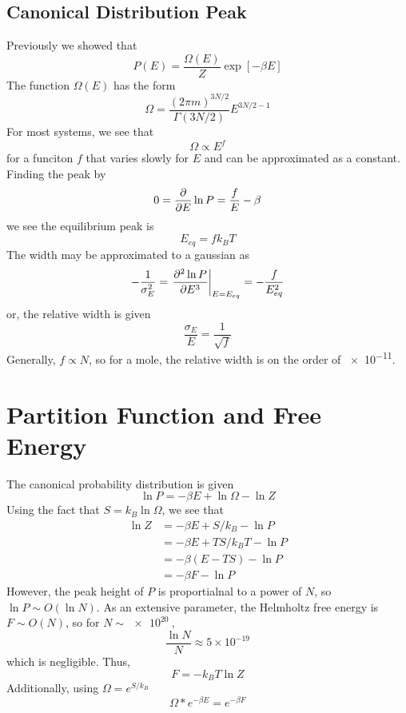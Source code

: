 \subsection{Canonical Distribution Peak}
Previously we showed that
\[P(E) = \frac{\Omega(E)}{Z}\exp[-\beta E]\]
The function \(\Omega(E)\) has the form
\[\Omega = \frac{(2\pi m)^{3N/2}}{\Gamma(3N/2)}E^{3N/2-1}\]
For most systems, we see that
\[\Omega\propto E^f\]
for a funciton \(f\) that varies slowly for \(E\) and can be approximated as a constant. Finding the peak by
\[0=\frac{\partial }{\partial E}\ln P = \frac{f}{E}-\beta\]
we see the equilibrium peak is 
\[E_{eq}=fk_BT\]
The width may be approximated to a gaussian as
\[-\frac{1}{\sigma_E^2} = \left.\frac{\partial ^2\ln P}{\partial E^3}\right|_{E=E_{eq}} = -\frac{f}{E_{eq}^2}\]
or, the relative width is given
\[\frac{\sigma_E}{E}=\frac{1}{\sqrt{f}}\]
Generally, \(f\propto N\), so for a mole, the relative width is on the order of \SI{e-11}{}.

\section{Partition Function and Free Energy}
The canonical probability distribution is given
\[\ln P = -\beta E + \ln \Omega - \ln Z\]
Using the fact that \(S=k_B\ln\Omega\), we see that
\begin{align*}
	\ln Z &= -\beta E + S/k_B - \ln P\\
	      &= -\beta E + TS/k_B T -\ln P\\
	      &= -\beta(E-TS) - \ln P\\
	      &= -\beta F -\ln P
\end{align*}
However, the peak height of \(P\) is proportialnal to a power of \(N\), so \(\ln P \sim O(\ln N)\). As an extensive parameter, the Helmholtz free energy is \(F\sim O(N)\), so for \(N\sim\SI{e20}{}\),
\[\frac{\ln N}{N}\approx 5\times 10^{-19}\]
which is negligible. Thus,
\begin{equation}
	F = -k_BT\ln Z
\end{equation}
Additionally, using \(\Omega = e^{S/k_B}\)
\begin{equation}
	\Omega*e^{-\beta E} = e^{-\beta F}
\end{equation}

